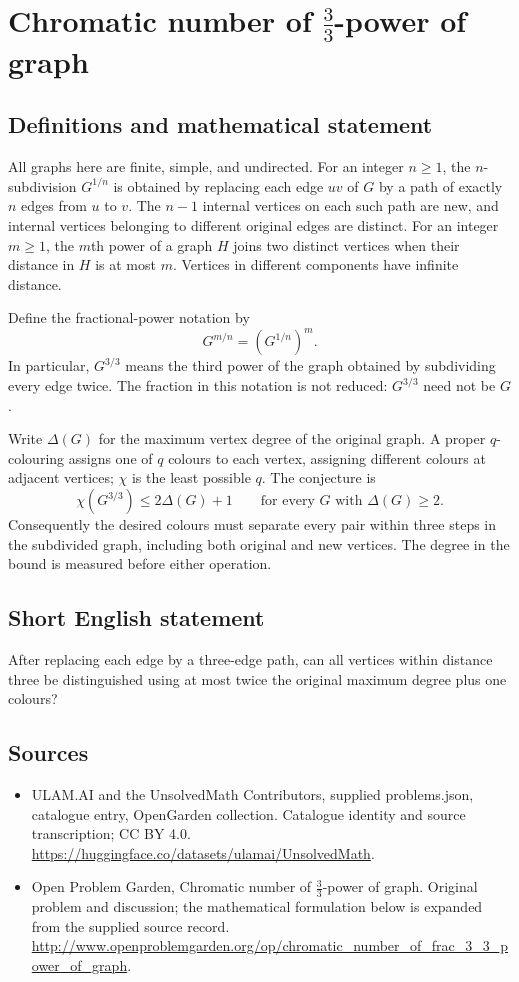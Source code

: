 \documentclass[11pt,a4paper]{article}
\begin{document}
\section*{Chromatic number of $\frac{3}{3}$-power of graph}\label{statement}

\subsection{Definitions and mathematical statement}
All graphs here are finite, simple, and undirected. For an integer
$n\geq1$, the $n$-subdivision $G^{1/n}$ is obtained by replacing
each edge $uv$ of $G$ by a path of exactly $n$ edges from $u$ to
$v$. The $n-1$ internal vertices on each such path are new, and
internal vertices belonging to different original edges are
distinct. For an integer $m\geq1$, the $m$th power of a graph $H$
joins two distinct vertices when their distance in $H$ is at most
$m$. Vertices in different components have infinite distance.

Define the fractional-power notation by
\[
 G^{m/n}=(G^{1/n})^m.
\]
In particular, $G^{3/3}$ means the third power of the graph obtained
by subdividing every edge twice. The fraction in this notation is
not reduced: $G^{3/3}$ need not be $G$.

Write $\Delta(G)$ for the maximum vertex degree of the original
graph. A proper $q$-colouring assigns one of $q$ colours to each
vertex, assigning different colours at adjacent vertices; $\chi$
is the least possible $q$. The conjecture is
\[
 \chi(G^{3/3})\leq2\Delta(G)+1
 \qquad\text{for every }G\text{ with }\Delta(G)\geq2.
\]
Consequently the desired colours must separate every pair within
three steps in the subdivided graph, including both original and
new vertices. The degree in the bound is measured before either
operation.
\subsection{Short English statement}
After replacing each edge by a three-edge path, can all vertices within distance three be distinguished using at most twice the original maximum degree plus one colours?
\subsection{Sources}
\begin{itemize}
\item[S1] ULAM.AI and the UnsolvedMath Contributors, supplied problems.json, catalogue entry, OpenGarden collection. Catalogue identity and source transcription; CC BY 4.0.
\url{https://huggingface.co/datasets/ulamai/UnsolvedMath}.
\item[S2] Open Problem Garden, Chromatic number of $\frac{3}{3}$-power of graph. Original problem and discussion; the mathematical formulation below is expanded from the supplied source record.
\url{http://www.openproblemgarden.org/op/chromatic_number_of_frac_3_3_power_of_graph}.
\end{itemize}
\end{document}
